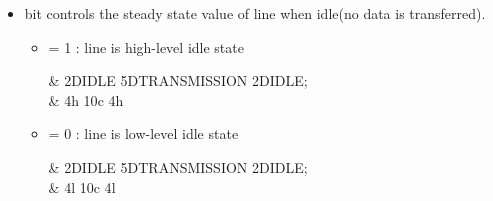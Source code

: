 \begin{itemize}
	\item {} bit controls the steady state value of  line when idle(no data is transferred).
	\begin{itemize}
		\item {} = 1 :  line is high-level idle state
		\begin{center}
			\begin{tikztimingtable}[%
				timing/dslope=0.1,
				timing/.style={x=5ex,y=2ex},
				x=5ex,
				timing/rowdist=3ex,
				timing/name/.style={font=\sffamily\scriptsize}
				]
				 & 2D{IDLE} 5D{TRANSMISSION} 2D{IDLE};\\
				         & 4{h} 10{c} 4{h}\\				
			\end{tikztimingtable}
		\end{center}
			
		\item {}  = 0 :  line is low-level idle state
		\begin{center}
			\begin{tikztimingtable}[%
				timing/dslope=0.1,
				timing/.style={x=5ex,y=2ex},
				x=5ex,
				timing/rowdist=3ex,
				timing/name/.style={font=\sffamily\scriptsize}
				]
				 & 2D{IDLE} 5D{TRANSMISSION} 2D{IDLE};\\
				         & 4{l} 10{c} 4{l}\\				
			\end{tikztimingtable}
		\end{center}
	\end{itemize}


\end{itemize}
